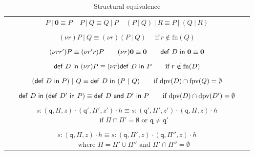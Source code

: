 \documentclass[a4paper,11pt,twoside]{report}
\newcommand{\kf}[1]{\textup{\textsf{#1}}\xspace}
\newcommand{\PP}{\ensuremath{P}}
\newcommand{\Q}{\ensuremath{Q}}
\newcommand{\DD}{\ensuremath{D}}
\newcommand{\pset}{\ensuremath{\Pi}}
\newcommand{\participant}[1]{\ensuremath{\mathtt{#1}}}
\newcommand{\q}{\ensuremath{\participant{q}}}
\newcommand{\s}{\ensuremath{s}}
\newcommand{\defIn}[1]{\ensuremath{\kf{def} \ #1 \ \kf{in}\ }}
\newcommand{\defD}{\ensuremath{\kf{def}\ \DD \ \kf{in}\ }}
\newcommand{\defDp}{\ensuremath{\kf{def}\ \DD' \ \kf{in}\ }}
\newcommand{\trival}[3]{\ensuremath{(#3,#2, #1)}}
\newcommand{\AND}[2]{\ensuremath{#1\ \kf{and}\ #2}}
\newcommand{\h}{\ensuremath{h}}
\newcommand{\Par}{\ensuremath{\ |\ }}
\newcommand{\cas}{\ensuremath{r}}
\newcommand{\mqueue}[2]{\ensuremath{#1 : #2}}
\newcommand{\queue}{\ensuremath{\h}}
\newcommand{\qcomp}[2]{\ensuremath{#1 \cdot #2}}
\newcommand{\qhead}[1]{\ensuremath{\qcomp{#1}{\queue}}}
\newcommand{\freen}[1]{\ensuremath{\text{fn}(#1)}}
\newcommand{\dpv}[1]{\ensuremath{\text{dpv}(#1)}}
\newcommand{\fpv}[1]{\ensuremath{\text{fpv}(#1)}}
\begin{document}
\begin{table}[tb]
\centering
\begin{tabular}{c}
  $P \Par \textbf{0}\equiv P\ \ \ \ \ P \Par Q\equiv Q \Par P\ \ \ \ \
  (P \Par Q) \Par R\equiv P \Par (Q \Par R)$\\
  \\
  $(\nu \cas)P \Par Q\equiv (\nu \cas)(P \Par Q)\ \ \ \ \ \ \text{if}\ \cas\notin
  \freen{\Q}$\\
  \\
  $(\nu \cas\cas')P\equiv (\nu \cas'\cas)P\ \ \ \ \ \ (\nu \cas)\textbf{0}\equiv \textbf{0}\ \
  \ \ \ \ \defD\textbf{0}\equiv \textbf{0}$\\
  \\
  $\defD(\nu \cas)P\equiv (\nu \cas)\defD\PP\ \ \ \ \ \ \text{if}\ \cas\notin
  \freen{D}$\\
  \\
  $(\defD\PP) \Par Q\equiv \defD{(P \Par Q)}\ \ \ \ \ \ \text{if}\ \dpv{D}\cap
  \fpv{Q}=\emptyset$\\
  \\
  $\defD(\defDp\PP)\equiv \defIn{\AND{D}{D'}}\PP\ \ \ \ \ \ \text{if}\
  \dpv{D}\cap \dpv{D'}=\emptyset$\\
  \\
   $\mqueue{\s}{
   \qhead
    {
        \qcomp
        {\trival{z}{\pset}{\q}}
        {\trival{z'}{\pset'}{\q'}}
    }
   } \equiv
   \mqueue{\s}{
   \qhead
    {
        \qcomp
        {\trival{z'}{\pset'}{\q'}}
        {\trival{z}{\pset}{\q}}
    }
   }$ 
   $\qquad \text{if $\pset \cap \pset'=\emptyset$ or $\q \ne \q'$}$\\
   \\
   $\mqueue{\s}{
   \qhead
    {
        {\trival{z}{ \pset}{\q}}
    }
   } \equiv
   \mqueue{\s}{
   \qhead
    {
        \qcomp
        {\trival{z}{\pset'}{\q}}
        {\trival{z}{\pset''}{\q}}
    }
   }$ 
   $\qquad \text{where $\pset = \pset' \cup \pset''$ and }\pset' \cap \pset''=\emptyset$
\end{tabular}
\caption{Structural equivalence}\label{tab:structcong}
\end{table}
\end{document}
